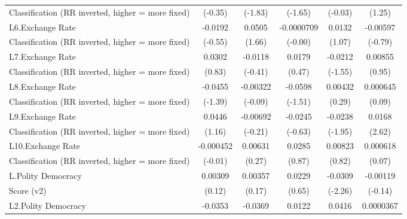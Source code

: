 {\begin{tabular}{l*{5}{c}}
Classification (RR inverted, higher = more fixed)&     (-0.35)         &     (-1.83)         &     (-1.65)         &     (-0.03)         &      (1.25)         \\
[1em]
L6.Exchange Rate    &     -0.0192         &      0.0505         &  -0.0000709         &      0.0132         &    -0.00597         \\
Classification (RR inverted, higher = more fixed)&     (-0.55)         &      (1.66)         &     (-0.00)         &      (1.07)         &     (-0.79)         \\
[1em]
L7.Exchange Rate    &      0.0302         &     -0.0118         &      0.0179         &     -0.0212         &     0.00855         \\
Classification (RR inverted, higher = more fixed)&      (0.83)         &     (-0.41)         &      (0.47)         &     (-1.55)         &      (0.95)         \\
[1em]
L8.Exchange Rate    &     -0.0455         &    -0.00322         &     -0.0598         &     0.00432         &    0.000645         \\
Classification (RR inverted, higher = more fixed)&     (-1.39)         &     (-0.09)         &     (-1.51)         &      (0.29)         &      (0.09)         \\
[1em]
L9.Exchange Rate    &      0.0446         &    -0.00692         &     -0.0245         &     -0.0238         &      0.0168\sym{**} \\
Classification (RR inverted, higher = more fixed)&      (1.16)         &     (-0.21)         &     (-0.63)         &     (-1.95)         &      (2.62)         \\
[1em]
L10.Exchange Rate   &   -0.000452         &     0.00631         &      0.0285         &     0.00823         &    0.000618         \\
Classification (RR inverted, higher = more fixed)&     (-0.01)         &      (0.27)         &      (0.87)         &      (0.82)         &      (0.07)         \\
[1em]
L.Polity Democracy  &     0.00309         &     0.00357         &      0.0229         &     -0.0309\sym{*}  &    -0.00119         \\
Score (v2)          &      (0.12)         &      (0.17)         &      (0.65)         &     (-2.26)         &     (-0.14)         \\
[1em]
L2.Polity Democracy &     -0.0353         &     -0.0369         &      0.0122         &      0.0416\sym{**} &   0.0000367         \\

\end{tabular}}
